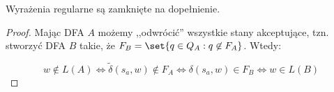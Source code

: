 \begin{theorem}
Wyrażenia regularne są zamknięte na dopełnienie.
\end{theorem}
\begin{proof}
 Mając DFA \(A\) możemy ,,odwrócić'' wszystkie stany akceptujące, tzn. stworzyć DFA \(B\) takie, że \(F_B = \set{q \in Q_A : q \not \in F_A}\). Wtedy:
 
 \[ 
    w \not\in L(A) \iff \tilde \delta(s_a, w) \not \in F_A \iff \delta(s_a, w) \in F_B \iff w \in L(B)
 \]
\end{proof}
